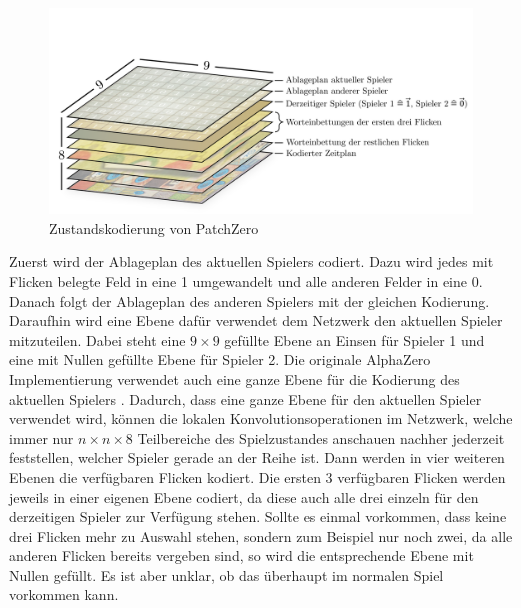 \vspace*{-0.35cm}
\begin{figure}[!ht]
    \centering
    \vspace*{-1.75cm}
    \includegraphics[width=\textwidth]{res/pictures/patch-zero-state.pdf}
    \vspace*{-0.45cm}
    \caption{Zustandskodierung von PatchZero}
    \label{fig:patch-zero-state}
\end{figure}
\vspace*{-0.25cm}

Zuerst wird der Ablageplan des aktuellen Spielers codiert. Dazu wird jedes mit Flicken belegte Feld in eine 1 umgewandelt und alle anderen Felder in eine 0. Danach folgt der Ablageplan des anderen Spielers mit der gleichen Kodierung. Daraufhin wird eine Ebene dafür verwendet dem Netzwerk den aktuellen Spieler mitzuteilen. Dabei steht eine $9\times 9$ gefüllte Ebene an Einsen für Spieler 1 und eine mit Nullen gefüllte Ebene für Spieler 2. Die originale AlphaZero Implementierung verwendet auch eine ganze Ebene für die Kodierung des aktuellen Spielers \cite[Anhang, S. 2]{2017.AlphaGoZeroPaper}. Dadurch, dass eine ganze Ebene für den aktuellen Spieler verwendet wird, können die lokalen Konvolutionsoperationen im Netzwerk, welche immer nur $n\times n\times 8$ Teilbereiche des Spielzustandes anschauen nachher jederzeit feststellen, welcher Spieler gerade an der Reihe ist. Dann werden in vier weiteren Ebenen die verfügbaren Flicken kodiert. Die ersten 3 verfügbaren Flicken werden jeweils in einer eigenen Ebene codiert, da diese auch alle drei einzeln für den derzeitigen Spieler zur Verfügung stehen. Sollte es einmal vorkommen, dass keine drei Flicken mehr zu Auswahl stehen, sondern zum Beispiel nur noch zwei, da alle anderen Flicken bereits vergeben sind, so wird die entsprechende Ebene mit Nullen gefüllt. Es ist aber unklar, ob das überhaupt im normalen Spiel vorkommen kann.

